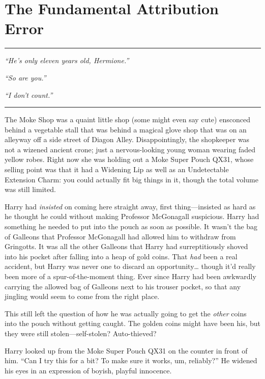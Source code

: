 \chapter{The Fundamental Attribution Error}

\begin{center}\rule{3in}{0.4pt}\end{center}

\emph{``He's only eleven years old, Hermione.''}

\emph{``So are you.''}

\emph{``I don't count.''}

\begin{center}\rule{3in}{0.4pt}\end{center}

The Moke Shop was a quaint little shop (some might even say cute)
ensconced behind a vegetable stall that was behind a magical glove shop
that was on an alleyway off a side street of Diagon Alley.
Disappointingly, the shopkeeper was not a wizened ancient crone; just a
nervous-looking young woman wearing faded yellow robes. Right now she
was holding out a Moke Super Pouch QX31, whose selling point was that it
had a Widening Lip as well as an Undetectable Extension Charm: you could
actually fit big things in it, though the total volume was still
limited.

Harry had \emph{insisted} on coming here straight away, first
thing---insisted as hard as he thought he could without making Professor
McGonagall suspicious. Harry had something he needed to put into the
pouch as soon as possible. It wasn't the bag of Galleons that Professor
McGonagall had allowed him to withdraw from Gringotts. It was all the
other Galleons that Harry had surreptitiously shoved into his pocket
after falling into a heap of gold coins. That \emph{had} been a real
accident, but Harry was never one to discard an opportunity\ldots{}
though it'd really been more of a spur-of-the-moment thing. Ever since
Harry had been awkwardly carrying the allowed bag of Galleons next to
his trouser pocket, so that any jingling would seem to come from the
right place.

This still left the question of how he was actually going to get the
\emph{other} coins into the pouch without getting caught. The golden
coins might have been his, but they were still stolen---self-stolen?
Auto-thieved?

Harry looked up from the Moke Super Pouch QX31 on the counter in front
of him. ``Can I try this for a bit? To make sure it works, um,
reliably?'' He widened his eyes in an expression of boyish, playful
innocence.

